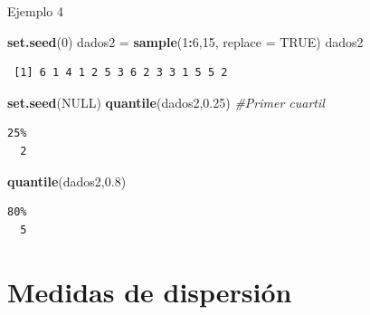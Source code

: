 \documentclass[
  ignorenonframetext,
]{beamer}
\newenvironment{Shaded}{\begin{snugshade}}{\end{snugshade}}
\newcommand{\AttributeTok}[1]{\textcolor[rgb]{0.13,0.29,0.53}{#1}}
\newcommand{\CommentTok}[1]{\textcolor[rgb]{0.56,0.35,0.01}{\textit{#1}}}
\newcommand{\ConstantTok}[1]{\textcolor[rgb]{0.56,0.35,0.01}{#1}}
\newcommand{\DecValTok}[1]{\textcolor[rgb]{0.00,0.00,0.81}{#1}}
\newcommand{\FloatTok}[1]{\textcolor[rgb]{0.00,0.00,0.81}{#1}}
\newcommand{\FunctionTok}[1]{\textcolor[rgb]{0.13,0.29,0.53}{\textbf{#1}}}
\newcommand{\NormalTok}[1]{#1}
\newcommand{\OtherTok}[1]{\textcolor[rgb]{0.56,0.35,0.01}{#1}}
\newcommand{\SpecialCharTok}[1]{\textcolor[rgb]{0.81,0.36,0.00}{\textbf{#1}}}
\begin{document}
\begin{frame}[fragile]{Ejemplo 4}
\label{ejemplo-4-14}
\begin{Shaded}
\begin{Highlighting}[]
\FunctionTok{set.seed}\NormalTok{(}\DecValTok{0}\NormalTok{)}
\NormalTok{dados2 }\OtherTok{=} \FunctionTok{sample}\NormalTok{(}\DecValTok{1}\SpecialCharTok{:}\DecValTok{6}\NormalTok{,}\DecValTok{15}\NormalTok{, }\AttributeTok{replace =} \ConstantTok{TRUE}\NormalTok{)}
\NormalTok{dados2}
\end{Highlighting}
\end{Shaded}

\begin{verbatim}
 [1] 6 1 4 1 2 5 3 6 2 3 3 1 5 5 2
\end{verbatim}

\begin{Shaded}
\begin{Highlighting}[]
\FunctionTok{set.seed}\NormalTok{(}\ConstantTok{NULL}\NormalTok{)}
\FunctionTok{quantile}\NormalTok{(dados2,}\FloatTok{0.25}\NormalTok{) }\CommentTok{\#Primer cuartil}
\end{Highlighting}
\end{Shaded}

\begin{verbatim}
25% 
  2 
\end{verbatim}

\begin{Shaded}
\begin{Highlighting}[]
\FunctionTok{quantile}\NormalTok{(dados2,}\FloatTok{0.8}\NormalTok{)}
\end{Highlighting}
\end{Shaded}

\begin{verbatim}
80% 
  5 
\end{verbatim}
\end{frame}

\section{Medidas de dispersión}\label{medidas-de-dispersiuxf3n}
\end{document}

